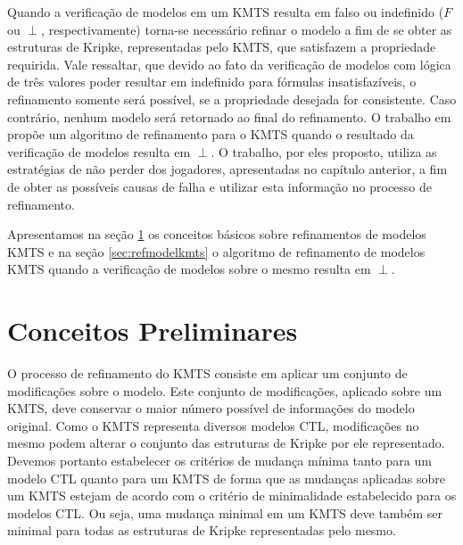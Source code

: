 \documentclass[normaltoc,capchap,capsec,times]{abnt}
\begin{document}
Quando a verificação de modelos em um KMTS resulta em falso ou indefinido ($F$ ou $\perp$, respectivamente) torna-se necessário refinar o modelo a fim de se obter as estruturas de Kripke, representadas pelo KMTS, que satisfazem a propriedade requirida. Vale ressaltar, que devido ao fato da verificação de modelos com lógica de três valores poder resultar em indefinido para fórmulas insatisfazíveis, o refinamento somente será possível, se a propriedade desejada for consistente. Caso contrário, nenhum modelo será retornado ao final do refinamento.  O trabalho em \cite{aline} propõe um algoritmo de refinamento para o KMTS quando o resultado da verificação de modelos resulta em $\perp$. O trabalho, por eles proposto, utiliza as estratégias de não perder dos jogadores, apresentadas no capítulo anterior, a fim de obter as possíveis causas de falha e utilizar esta informação no processo de refinamento.


Apresentamos na seção \ref{sec:refconceitos} os conceitos básicos sobre refinamentos de modelos KMTS e na seção \ref{sec:refmodelkmts} o algoritmo de refinamento de modelos KMTS quando a verificação de modelos sobre o mesmo resulta em $\perp$.

%

\section{Conceitos Preliminares}
\label{sec:refconceitos}

O processo de refinamento do KMTS consiste em aplicar um conjunto de modificações sobre o modelo. Este conjunto de modificações, aplicado sobre um KMTS, deve conservar o maior número possível de informações do modelo original. Como o KMTS representa diversos modelos CTL, modificações no mesmo podem alterar o conjunto das estruturas de Kripke por ele representado. Devemos portanto estabelecer os critérios de mudança mínima tanto para um modelo CTL quanto para um KMTS de forma que as mudanças aplicadas sobre um KMTS estejam de acordo com o critério de minimalidade estabelecido para os modelos CTL. Ou seja, uma mudança minimal em um KMTS deve também ser minimal para todas as estruturas de Kripke representadas pelo mesmo. 
\end{document}
